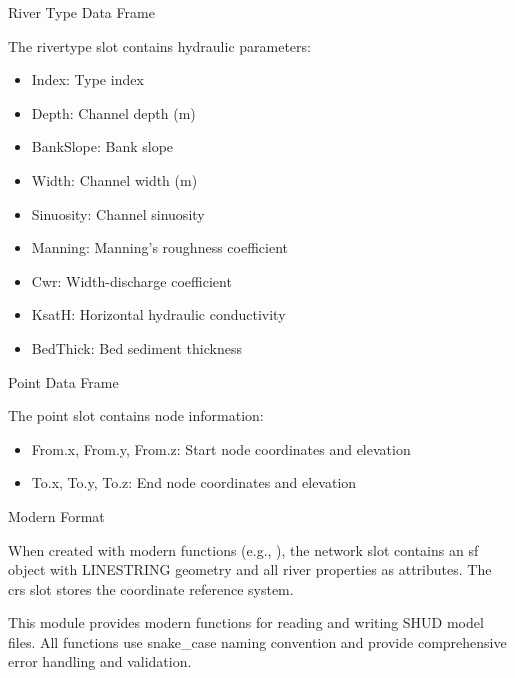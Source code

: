 \documentclass[a4paper]{book}
\begin{document}
%
\begin{Section}{River Type Data Frame}

The rivertype slot contains hydraulic parameters:
\begin{itemize}

\item{} Index: Type index
\item{} Depth: Channel depth (m)
\item{} BankSlope: Bank slope
\item{} Width: Channel width (m)
\item{} Sinuosity: Channel sinuosity
\item{} Manning: Manning's roughness coefficient
\item{} Cwr: Width-discharge coefficient
\item{} KsatH: Horizontal hydraulic conductivity
\item{} BedThick: Bed sediment thickness

\end{itemize}

\end{Section}
%
\begin{Section}{Point Data Frame}

The point slot contains node information:
\begin{itemize}

\item{} From.x, From.y, From.z: Start node coordinates and elevation
\item{} To.x, To.y, To.z: End node coordinates and elevation

\end{itemize}

\end{Section}
%
\begin{Section}{Modern Format}

When created with modern functions (e.g., ),
the network slot contains an sf object with LINESTRING geometry and
all river properties as attributes. The crs slot stores the coordinate
reference system.
\end{Section}
%
\begin{Description}\relax
This module provides modern functions for reading and writing SHUD model files.
All functions use snake\_case naming convention and provide comprehensive
error handling and validation.
\end{Description}
\end{document}
